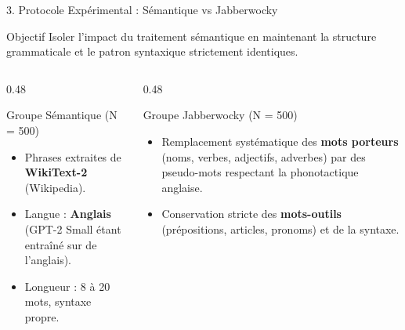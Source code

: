 \documentclass[t, aspectratio=169]{beamer}
\begin{document}
\begin{frame}{3. Protocole Expérimental : Sémantique vs Jabberwocky}
  \begin{block}{Objectif}
    Isoler l'impact du traitement sémantique en maintenant la structure grammaticale et le patron syntaxique strictement identiques.
  \end{block}
  \vspace{0.1cm}
  \begin{columns}[t]
    \begin{column}{0.48\textwidth}
      \begin{block}{Groupe Sémantique (N = 500)}
        \scriptsize
        \begin{itemize}
          \item Phrases extraites de \textbf{WikiText-2} (Wikipedia).
          \item Langue : \textbf{Anglais} (GPT-2 Small étant entraîné sur de l'anglais).
          \item Longueur : 8 à 20 mots, syntaxe propre.
        \end{itemize}
      \end{block}
    \end{column}
    
    \begin{column}{0.48\textwidth}
      \begin{block}{Groupe Jabberwocky (N = 500)}
        \scriptsize
        \begin{itemize}
          \item Remplacement systématique des \textbf{mots porteurs} (noms, verbes, adjectifs, adverbes) par des pseudo-mots respectant la phonotactique anglaise.
          \item Conservation stricte des \textbf{mots-outils} (prépositions, articles, pronoms) et de la syntaxe.
        \end{itemize}
      \end{block}
    \end{column}
  \end{columns}
  \vspace{0.2cm}
  \centering
\end{frame}
\end{document}
